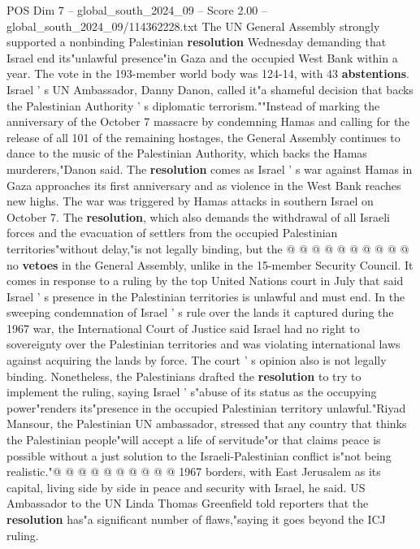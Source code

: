 \begin{textsample}{POS Dim 7 – global\_south\_2024\_09 – Score 2.00 – global\_south\_2024\_09/114362228.txt}  \label{ex:f7_pos_274}
The UN General Assembly strongly supported a nonbinding Palestinian \textbf{resolution} Wednesday demanding that Israel end its"unlawful presence"in Gaza and the occupied West Bank within a year.
The vote in the 193-member world body was 124-14, with 43 \textbf{abstentions}.
Israel ' s UN Ambassador, Danny Danon, called it"a shameful decision that backs the Palestinian Authority ' s diplomatic terrorism.""Instead of marking the anniversary of the October 7 massacre by condemning Hamas and calling for the release of all 101 of the remaining hostages, the General Assembly continues to dance to the music of the Palestinian Authority, which backs the Hamas murderers,"Danon said.
The \textbf{resolution} comes as Israel ' s war against Hamas in Gaza approaches its first anniversary and as violence in the West Bank reaches new highs.
The war was triggered by Hamas attacks in southern Israel on October 7.
The \textbf{resolution}, which also demands the withdrawal of all Israeli forces and the evacuation of settlers from the occupied Palestinian territories"without delay,"is not legally binding, but the @ @ @ @ @ @ @ @ @ @ no \textbf{vetoes} in the General Assembly, unlike in the 15-member Security Council.
It comes in response to a ruling by the top United Nations court in July that said Israel ' s presence in the Palestinian territories is unlawful and must end.
In the sweeping condemnation of Israel ' s rule over the lands it captured during the 1967 war, the International Court of Justice said Israel had no right to sovereignty over the Palestinian territories and was violating international laws against acquiring the lands by force.
The court ' s opinion also is not legally binding.
Nonetheless, the Palestinians drafted the \textbf{resolution} to try to implement the ruling, saying Israel ' s"abuse of its status as the occupying power"renders its"presence in the occupied Palestinian territory unlawful."Riyad Mansour, the Palestinian UN ambassador, stressed that any country that thinks the Palestinian people"will accept a life of servitude"or that claims peace is possible without a just solution to the Israeli-Palestinian conflict is"not being realistic."@ @ @ @ @ @ @ @ @ @ 1967 borders, with East Jerusalem as its capital, living side by side in peace and security with Israel, he said.
US Ambassador to the UN Linda Thomas Greenfield told reporters that the \textbf{resolution} has"a significant number of flaws,"saying it goes beyond the ICJ ruling.

\end{textsample}
